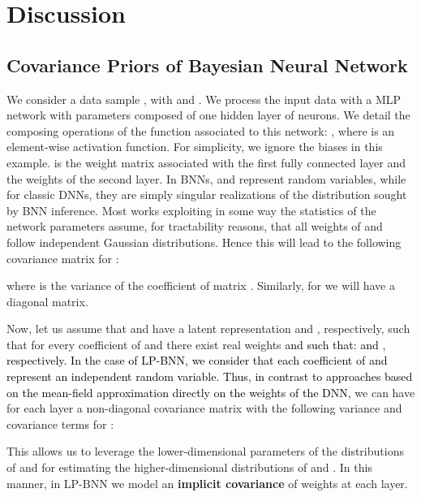 \documentclass[10pt,twocolumn,letterpaper]{article}
\newcommand\emi{\textcolor{black}}
\newcommand\Gianni{\textcolor{black}}
\newcommand{\ab}[1]{\textcolor{black}{#1}}
\begin{document}
\section{Discussion}

\subsection{Covariance Priors of Bayesian Neural Network}
\label{subsection1appendix}

We consider a data sample , with  and .
We process the input data  with a MLP network  with parameters  composed of one hidden layer of  neurons. We detail the composing operations of the function  associated to this network: , where  is an element-wise activation function. For simplicity, we ignore the biases in this example.  is the weight matrix associated with the first fully connected layer and  the weights of the second layer. 
In BNNs,  and  represent random variables, 
while for classic DNNs, they are simply singular realizations of the distribution sought by BNN inference.
Most works exploiting in some way the statistics of the network parameters assume, for tractability reasons, that all weights of   and  follow independent Gaussian distributions.  Hence this will lead to the following covariance matrix for : 



where  is the variance of the coefficient 
\ab{} of matrix . Similarly, for  we will have a diagonal matrix.

Now, let us assume that  and    have a latent representation 
\ab{}
and  
\ab{}, respectively, such that  for every coefficient 
\ab{}  of  and  there exist real weights 
\ab{ and  such that:  and , respectively.}
\Gianni{In the case of LP-BNN, we consider that each coefficient of   and  represent an independent random variable.} 
\ab{Thus, in contrast to approaches based on the mean-field approximation  \Gianni{directly on the weights of the DNN},} we can have for each layer a non-diagonal covariance matrix with the following variance and covariance term\emi{s} for :




This allows us to leverage the lower-dimensional parameters of the distributions of  and  for estimating the higher-dimensional distributions of  and . In this manner, in LP-BNN we model an \textbf{implicit covariance} of weights at each layer.
\end{document}
